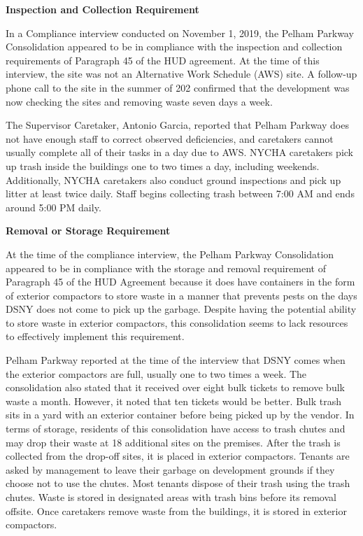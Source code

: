 

\textbf{Inspection and Collection Requirement}  

In a Compliance interview conducted on November 1, 2019, the Pelham Parkway Consolidation appeared to be in compliance with the inspection and collection requirements of Paragraph 45 of the HUD agreement. At the time of this interview, the site was not an Alternative Work Schedule (AWS) site. A follow-up phone call to the site in the summer of 202 confirmed that the development was now checking the sites and removing waste seven days a week.

The Supervisor Caretaker, Antonio Garcia, reported that Pelham Parkway does not have enough staff to correct observed deficiencies, and caretakers cannot usually complete all of their tasks in a day due to AWS. NYCHA caretakers pick up trash inside the buildings one to two times a day, including weekends. Additionally, NYCHA caretakers also conduct ground inspections and pick up litter at least twice daily. Staff begins collecting trash between 7:00 AM and ends around 5:00 PM daily.

 

\textbf{Removal or Storage Requirement}  

At the time of the compliance interview, the Pelham Parkway Consolidation appeared to be in compliance with the storage and removal requirement of Paragraph 45 of the HUD Agreement because it does have containers in the form of exterior compactors to store waste in a manner that prevents pests on the days DSNY does not come to pick up the garbage. Despite having the potential ability to store waste in exterior compactors, this consolidation seems to lack resources to effectively implement this requirement.

 

Pelham Parkway reported at the time of the interview that DSNY comes when the exterior compactors are full, usually one to two times a week. The consolidation also stated that it received over eight bulk tickets to remove bulk waste a month. However, it noted that ten tickets would be better. Bulk trash sits in a yard with an exterior container before being picked up by the vendor. In terms of storage, residents of this consolidation have access to trash chutes and may drop their waste at 18 additional sites on the premises. After the trash is collected from the drop-off sites, it is placed in exterior compactors. Tenants are asked by management to leave their garbage on development grounds if they choose not to use the chutes. Most tenants dispose of their trash using the trash chutes. Waste is stored in designated areas with trash bins before its removal offsite. Once caretakers remove waste from the buildings, it is stored in exterior compactors.

